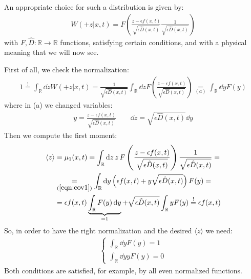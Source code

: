 \documentclass[../template.tex]{subfiles}
\begin{document}
An appropriate choice for such a distribution is given by:
\begin{align}
    W(+z|x,t) = F\left(\frac{z-\epsilon f(x,t)}{\sqrt{\epsilon \hat{D}(x,t)}} \frac{1}{\sqrt{\epsilon \hat{D}(x,t)}}  \right)
    \label{eqn:Fbig}
\end{align}
with $F, \hat{D}\colon \mathbb{R} \to \mathbb{R}$ functions, satisfying certain conditions, and with a physical meaning that we will now see.

First of all, we check the normalization:
\begin{align*}
    1 \overset{!}{=} \int_{\mathbb{R}} \dd{z} W(+z|x,t)  = \frac{1}{\sqrt{\epsilon \hat{D}(x,t)}} \int_{\mathbb{R}} \dd{z} F\left(\frac{z-\epsilon f(x,t)}{\sqrt{\epsilon \hat{D}(x,t)}} \right) \underset{(a)}{=} \int_{\mathbb{R}} \dd{y} F(y)  
\end{align*}
where in (a) we changed variables:
\begin{align}
    y = \frac{z-\epsilon f(x,t) }{\sqrt{\epsilon \hat{D}(x,t)}} \qquad \dd{z} = \sqrt{\epsilon \hat{D}(x,t)} \dd{y}  \label{eqn:cov1}
\end{align}
Then we compute the first moment:
\begin{align*}
    \langle z \rangle &= \mu_1(x,t) = \int_{\mathbb{R}} \dd{z} z \, F\left(\frac{z- \epsilon f(x,t)}{\sqrt{\epsilon \hat{D}(x,t)}} \right) \frac{1}{\sqrt{\epsilon \hat{D}(x,t)}} =\\
    &\underset{(\ref{eqn:cov1})}{=} \int_{\mathbb{R}} \dd{y} \left(\epsilon f(x,t) + y \sqrt{\epsilon \hat{D}(x,t)}\right) F(y) = \\
    &= \epsilon f(x,t) \underbrace{\int_{\mathbb{R}} F(y) \dd{y}}_{=1} + \sqrt{\epsilon \hat{D}(x,t)} \int_{\mathbb{R}} yF(y) \overset{!}{=} \epsilon f(x,t)
\end{align*}
So, in order to have the right normalization and the desired $\langle z \rangle$ we need:
\begin{align*}
    \begin{cases}
        \int_{\mathbb{R}} \dd{y} F(y) = 1\\
        \int_{\mathbb{R}} \dd{y} y F(y) = 0
    \end{cases}
\end{align*}
Both conditions are satisfied, for example, by all even normalized functions.
\end{document}
